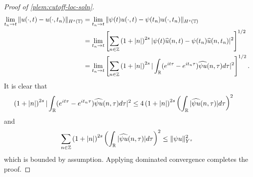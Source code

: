 \begin{proof}[Proof of \cref{plem:cutoff-loc-soln}]
%
%
\begin{equation*}
  \begin{split}
    \lim_{t_{n} \to t} \|u(\cdot, t) - u(\cdot, t_{n})\|_{H^s(\mathbb{T})} 
    & = \lim_{t_{n} \to t} \|\psi(t) u(\cdot, t) - \psi(t_n) u(\cdot, t_{n})\|_{H^s(\mathbb{T})} 
    \\
    & = \lim_{t_n \to t} \left[ \sum_{n \in \mathbb{Z}}\left( 1 + | n |
    \right)^{2s} | \psi(t)  \widehat{u}(n, t) - \psi(t_n) \widehat{ u}(n, t_n) |^2 \right]^{1/2}
    \\
    & = \lim_{t_n \to t} \left[ \sum_{n \in \mathbb{Z}} \left( 1 + | n |
    \right)^{2s} | \int_{\mathbb{R}} (e^{it \tau} - e^{it_{n} \tau}) \widehat{\psi u}(n,
    \tau) d \tau |^2 \right]^{1/2}.
  \end{split}
\end{equation*}
    It is clear that
    \begin{equation*}
      \begin{split}
        \left( 1 + | n |
        \right)^{2s} | \int_{\mathbb{R}} (e^{it \tau} - e^{it_{n}\tau}) \widehat{\psi u}(n, \tau) d \tau |^2 
    & \le 4  \left( 1 + | n |
    \right)^{2s} \left ( \int_{\mathbb{R}} |\widehat{\psi u}(n, \tau)| d \tau
    \right )^2 
  \end{split}
\end{equation*}
and 
%
%
\begin{equation*}
  \begin{split}
 \sum_{n \in \mathbb{Z}} \left( 1 + | n |
    \right)^{2s} \left ( \int_{\mathbb{R}} |\widehat{\psi u}(n, \tau)| d \tau
    \right ) ^2 
    \le \|\psi u \|_{Y^s}^2 
  \end{split}
\end{equation*}
which is bounded by assumption.
Applying dominated convergence completes the proof. 
\end{proof}
%
%
